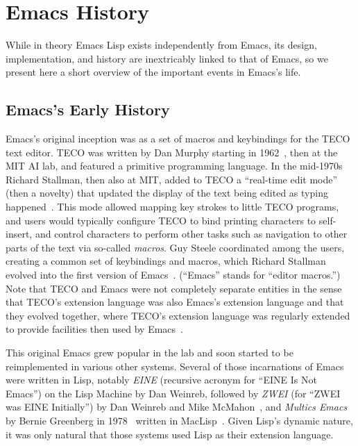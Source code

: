 \documentclass[format=acmsmall,screen]{acmart}
\newcommand \Elisp {Emacs Lisp}
\begin{document}
\section{Emacs History}
\label{sec:emacs-history}

While in theory \Elisp{} exists independently from Emacs, its design,
implementation, and history are inextricably linked to that of Emacs, so we
present here a short overview of the important events in Emacs's life.

\subsection{Emacs's Early History}
\label{sec:emacs-early-history}

Emacs's original inception was as a set of macros and keybindings for the
TECO text editor.  TECO was written by Dan Murphy starting in
1962~\cite{Murphy09}, then at the MIT AI lab, and featured a primitive
programming language.  In the mid-1970s Richard
Stallman, then also at MIT, added to TECO a ``real-time edit mode'' (then
a novelty) that updated the display of the text being edited as typing
happened~\cite{MulticsEmacs1996}.  This mode allowed mapping key strokes to little TECO programs, and
users would typically configure TECO to bind printing characters to
self-insert, and control characters to perform other tasks such as
navigation to other parts of the text via so-called \textit{macros}.  Guy Steele
coordinated among the users, creating a common set of keybindings and macros, which
Richard Stallman evolved into the first version of
Emacs~\cite{EmacsLore,Seibel2009}.  (``Emacs'' stands for ``editor macros.'')
Note that TECO and Emacs were not completely separate entities in the sense
that TECO's extension language was also Emacs's extension language and that
they evolved together, where TECO's extension language was regularly
extended to provide facilities then used by Emacs~\cite{Stallman2002}.

This original Emacs grew popular in the lab and soon started to be
reimplemented in various other systems.  Several of those incarnations of
Emacs were written in Lisp, notably \emph{EINE} (recursive acronym for
``EINE Is Not Emacs'') on the Lisp Machine by Dan Weinreb, followed by
\emph{ZWEI} (for ``ZWEI was EINE Initially'') by Dan Weinreb and Mike
McMahon~\cite{Weinreb1979}, and \emph{Multics Emacs} by Bernie Greenberg in
1978~\cite{MulticsEmacs1996,Stallman2002} written in MacLisp~\cite{Moon1974,Pitman1983}.
Given Lisp's dynamic nature, it was only natural that those systems used
Lisp as their extension language.
\end{document}
